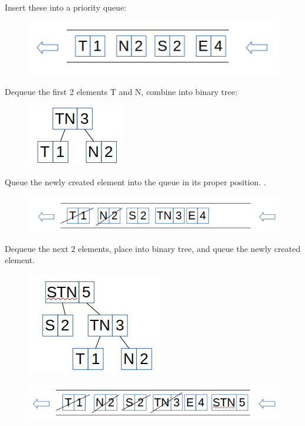 \documentclass{article}
\begin{document}
Insert these into a priority queue: 

\begin{figure}[H]
\includegraphics[scale=0.5]{./P15/0}
\centering
\end{figure}

Dequeue the first 2 elements T and N, combine into binary tree:

\begin{figure}[H]
\includegraphics[scale=0.5]{./P15/TN}
\centering
\end{figure}

Queue the newly created element into the queue in its proper position. . 

\begin{figure}[H]
\includegraphics[scale=0.5]{./P15/TN_Queue}
\centering
\end{figure}


Dequeue the next 2 elements, place into binary tree, and queue the newly created element. 


\begin{figure}[H]
\includegraphics[scale=0.5]{./P15/STN}
\centering
\end{figure}

\begin{figure}[H]
\includegraphics[scale=0.5]{./P15/STN_Queue}
\centering
\end{figure}
\end{document}
